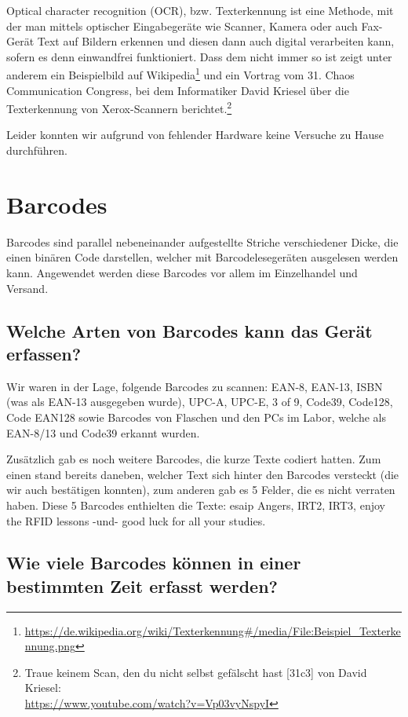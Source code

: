 \documentclass[paper=a4,fontsize=11pt,headsepline,footsepline,parskip=half]{scrartcl}
\begin{document}
\begin{titlepage}
Optical character recognition (OCR), bzw. Texterkennung ist eine Methode, mit der man mittels optischer
Eingabegeräte wie Scanner, Kamera oder auch Fax-Gerät Text auf Bildern erkennen und diesen dann auch
digital verarbeiten kann, sofern es denn einwandfrei funktioniert. Dass dem nicht immer so ist zeigt
unter anderem ein Beispielbild auf Wikipedia\footnote{\url{https://de.wikipedia.org/wiki/Texterkennung\#/media/File:Beispiel_Texterkennung.png}}
und ein Vortrag vom 31. Chaos Communication Congress, bei dem Informatiker David Kriesel über die Texterkennung
von Xerox-Scannern berichtet.\footnote{Traue keinem Scan, den du nicht selbst gefälscht hast [31c3] von David Kriesel:\\ \url{https://www.youtube.com/watch?v=Vp03vyNspyI}}

Leider konnten wir aufgrund von fehlender Hardware keine Versuche zu Hause durchführen.

\end{titlepage}

\section{Barcodes}

Barcodes sind parallel nebeneinander aufgestellte Striche verschiedener Dicke, die einen binären Code darstellen,
welcher mit Barcodelesegeräten ausgelesen werden kann. Angewendet werden diese Barcodes vor allem im Einzelhandel und Versand.

\subsection{Welche Arten von Barcodes kann das Gerät erfassen?}

Wir waren in der Lage, folgende Barcodes zu scannen: EAN-8, EAN-13, ISBN (was als EAN-13 ausgegeben wurde),
UPC-A, UPC-E, 3 of 9, Code39, Code128, Code EAN128 sowie Barcodes von Flaschen und den PCs im Labor, welche als EAN-8/13 und Code39 erkannt wurden.

Zusätzlich gab es noch weitere Barcodes, die kurze Texte codiert hatten. Zum einen stand bereits daneben, welcher Text sich hinter den Barcodes
versteckt (die wir auch bestätigen konnten), zum anderen gab es 5 Felder, die es nicht verraten haben. Diese 5 Barcodes enthielten die Texte:
esaip Angers, IRT2, IRT3, enjoy the RFID lessons -und- good luck for all your studies.

\subsection{Wie viele Barcodes können in einer bestimmten Zeit erfasst werden?}
\end{document}
